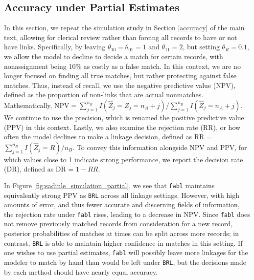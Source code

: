 \documentclass[ba]{imsart}
\begin{document}
	\hypertarget{partial}{%
	\subsection{Accuracy under Partial Estimates}\label{partial}}

In this section, we repeat the simulation study in Section \ref{accuracy} of the main text, allowing for clerical review rather than forcing all records to have or not have links.  Specifically, by leaving $\theta_{10} = \theta_{01} = 1$ and $\theta_{11} = 2$, but setting $\theta_R = 0.1$, we allow the model to decline to decide a match for certain records, with nonassignment being 10\% as costly as a false match. In this context, we are no longer focused on finding all true matches, but rather protecting against false matches. Thus, instead of recall, we use the negative predictive value (NPV), defined as the proportion of non-links that are actual nonmatches. Mathematically, $\text{NPV} = \sum_{j=1}^{n_B} I(\hat{Z}_j = Z_j = n_A + j)$/$\sum_{j=1}^{n_B} I(\hat{Z}_j = n_A + j)$. We continue to use the precision, which is renamed the positive predictive value (PPV) in this context. Lastly, we also examine the rejection rate (RR), or how often the model declines to make a linkage decision, defined as RR = $\sum_{j=1}^{n_B} I(\hat{Z}_j = R)/n_B$. To convey this information alongside NPV and PPV, for which values close to 1 indicate strong performance, we report the decision rate (DR), defined as DR = $1 - RR$.

In Figure \ref{fig:sadinle_simulation_partial}, we see that \texttt{fabl} maintains equivalently strong PPV as \texttt{BRL} across all linkage settings. However, with high amounts of error, and thus fewer accurate and discerning fields of information, the rejection rate under \texttt{fabl} rises, leading to a decrease in NPV. Since \texttt{fabl} does not remove previously matched records from consideration for a new record, posterior probabilities of matches at times can be split across more records; in contrast, \texttt{BRL} is able to maintain higher confidence in matches in this setting. If one wishes to use partial estimates, \texttt{fabl} will possibly leave more linkages for the modeler to match by hand than would be left under \texttt{BRL}, but the decisions made by each method should have nearly equal accuracy. 

\end{document}
